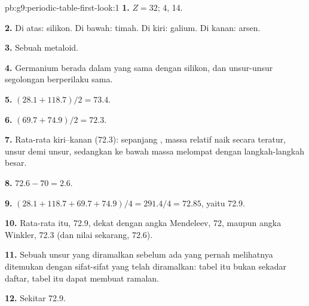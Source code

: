 \begin{solution}{pb:g9:periodic-table-first-look:1}
\textbf{1.} $Z = 32$;  4,  14.

\textbf{2.} Di atas: silikon. Di bawah: timah. Di kiri: galium. Di
kanan: arsen.

\textbf{3.} Sebuah metaloid.

\textbf{4.} Germanium berada dalam  yang sama dengan silikon, dan
unsur-unsur segolongan berperilaku sama.

\textbf{5.} $(28.1 + 118.7)/2 = 73.4$.

\textbf{6.} $(69.7 + 74.9)/2 = 72.3$.

\textbf{7.} Rata-rata kiri--kanan (72.3): sepanjang , massa  relatif
naik secara teratur, unsur demi unsur, sedangkan ke bawah  massa
 melompat dengan langkah-langkah besar.

\textbf{8.} $72.6 - 70 = 2.6$.

\textbf{9.} $(28.1 + 118.7 + 69.7 + 74.9)/4 = 291.4/4 = 72.85$, yaitu
72.9.

\textbf{10.} Rata-rata itu, 72.9, dekat dengan angka Mendeleev, 72,
maupun angka Winkler, 72.3 (dan nilai sekarang, 72.6).

\textbf{11.} Sebuah unsur yang diramalkan sebelum ada yang pernah
melihatnya ditemukan dengan sifat-sifat yang telah diramalkan: tabel itu
bukan sekadar daftar, tabel itu dapat membuat ramalan.

\textbf{12.} Sekitar 72.9.
\end{solution}
